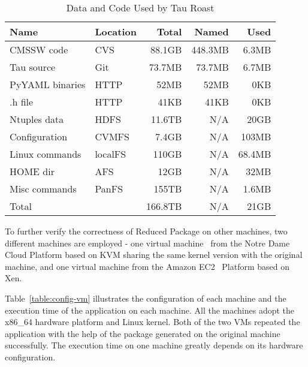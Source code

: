 \begin{table}
	\centering
	    \begin{tabular}{llrrr}
	        \hline
	        \bf Name & \bf Location & \bf Total & \bf Named & \bf Used \\ 
	        \hline
	        CMSSW code     & CVS & 88.1GB & 448.3MB & 6.3MB\\ \hline
	        Tau source       & Git & 73.7MB & 73.7MB & 6.7MB \\ \hline
	        PyYAML binaries    & HTTP & 52MB & 52MB & 0KB \\ \hline
	        .h file       & HTTP& 41KB & 41KB & 0KB \\ \hline \hline
	        Ntuples data    & HDFS& 11.6TB & N/A& 20GB \\ \hline
	        Configuration & CVMFS & 7.4GB & N/A & 103MB \\ \hline
	        Linux commands & localFS & 110GB &  N/A & 68.4MB \\ \hline     
	        HOME dir& AFS &12GB & N/A & 32MB\\ \hline
	        Misc commands & PanFS & 155TB & N/A  & 1.6MB \\ \hline
	        Total      &    & 166.8TB            & N/A & 21GB \\ \hline
	    \end{tabular}
	    \caption{Data and Code Used by Tau Roast}
	    \label{table:size-original-real}
\end{table}
	    
To further verify the correctness of Reduced Package on other machines, two different machines are employed -
one virtual
machine~\cite{goldberg1974survey} from the Notre Dame Cloud Platform based on KVM sharing the same kernel version with the original machine,
and one virtual machine from  the Amazon EC2~\cite{amazon2010amazon} Platform based on Xen.

Table~\ref{table:config-vm} illustrates the configuration of 
each machine and the execution time of the application on each machine.
All the machines adopt the x86\_64 hardware platform and Linux kernel.
Both of the two VMs repeated the application with the help of the package generated on the original machine successfully.
The execution time on one machine greatly depends on its hardware configuration.

